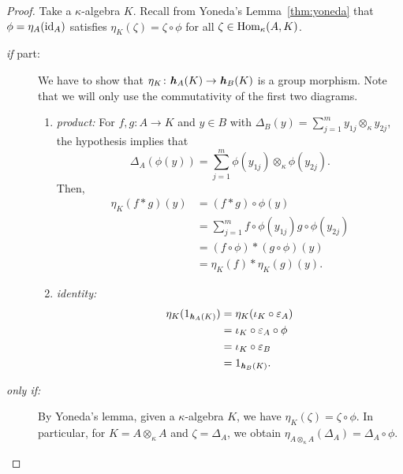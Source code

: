 \begin{proof} Take a $\kappa$-algebra $K$. Recall from Yoneda's Lemma~\ref{thm:yoneda} that $\phi=\eta_A(\text{\rm id}_A)$ satisfies $\eta_K(\zeta)=\zeta\circ\phi$ for all $\zeta\in{\rm Hom}_\kappa(A,K)$.
    \begin{description}
        \item[\textit{if\/} part:] We have to show that $\eta_K\colon\textrm{\boldmath$\mathit h$}_A(K)\to\textrm{\boldmath$\mathit h$}_B(K)$ is a group morphism. Note that we will only use the commutativity of the first two diagrams.
        \begin{enumerate}[-]
            \item\textit{product:} For $f,g\colon A\to K$ and $y\in B$ with $\Delta_B(y)=\sum_{j=1}^my_{1j}\otimes_\kappa y_{2j}$, the hypothesis implies that
            $$
                \Delta_A(\phi(y))
                    =\sum_{j=1}^m\phi(y_{1j})\otimes_\kappa \phi(y_{2j}).
            $$
            Then,
                \begin{align*}
                    \eta_K(f*g)(y) &= (f*g)\circ\phi(y)\\
                        &= \sum_{j=1}^mf\circ\phi(y_{1j})g\circ\phi(y_{2j})\\
                        &= (f\circ\phi) * (g\circ\phi)(y)\\
                        &= \eta_K(f)*\eta_K(g)(y).
                \end{align*}
                
            \item\textit{identity:}
            \begin{align*}
                \eta_K(1_{\textrm{\boldmath$\mathit h$}_A(K)})
                    &= \eta_K(\iota_K\circ\varepsilon_A)\\
                    &= \iota_K\circ\varepsilon_A\circ\phi\\
                    &= \iota_K\circ\varepsilon_B\\
                    &= 1_{\textrm{\boldmath$\mathit h$}_B(K)}.
            \end{align*}
        \end{enumerate}

        \item[\textit{only if:}] By Yoneda's lemma, given a $\kappa$-algebra $K$, we have $\eta_K(\zeta)=\zeta\circ\phi$. In particular, for $K=A\otimes_\kappa A$ and $\zeta=\Delta_A$, we obtain $\eta_{A\otimes_\kappa A}(\Delta_A)=\Delta_A\circ\phi$.
        

\end{description}
\end{proof}
